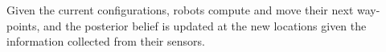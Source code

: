 \documentclass[letterpaper, 10 pt, conference]{ieeeconf}
\DeclareMathOperator*{\argmin}{arg\,min}
\begin{document}
%
Given the current configurations, robots compute and move their next way-points, and the posterior belief is updated at the new locations given the information collected from their sensors.
\end{document}
